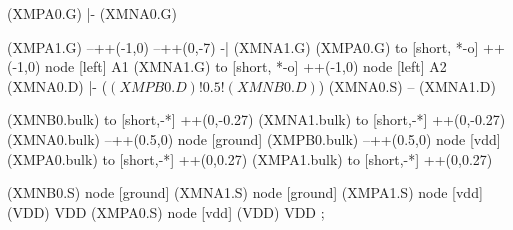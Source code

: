 \begin{circuitikz}[american]
	(XMPA0.G) |- (XMNA0.G)
	
	(XMPA1.G) --++(-1,0) --++(0,-7) -| (XMNA1.G)
	(XMPA0.G) to [short, *-o] ++(-1,0) node [left] {A1}
	(XMNA1.G) to [short, *-o] ++(-1,0) node [left] {A2}
	(XMNA0.D) |- ($(XMPB0.D)!0.5!(XMNB0.D)$)
	(XMNA0.S) -- (XMNA1.D)
	
    (XMNB0.bulk) to [short,-*] ++(0,-0.27)
	(XMNA1.bulk) to [short,-*] ++(0,-0.27)
	(XMNA0.bulk) --++(0.5,0) node [ground]{}
	(XMPB0.bulk) --++(0.5,0) node [vdd]{}
	(XMPA0.bulk) to [short,-*] ++(0,0.27)
	(XMPA1.bulk) to [short,-*] ++(0,0.27)


	(XMNB0.S) node [ground] {}
	(XMNA1.S) node [ground] {}
	(XMPA1.S) node [vdd] (VDD) {VDD}
	(XMPA0.S) node [vdd] (VDD) {VDD}
;

\end{circuitikz}
